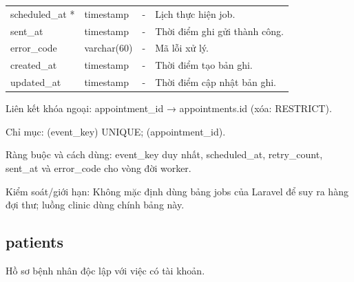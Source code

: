 {\begin{longtable}{@{}L{\textwidth-4.86pt\relax} L{\textwidth-3.96pt\relax} L{\textwidth-2.88pt\relax} L{\textwidth-6.3pt\relax}@{}}
scheduled\_\allowbreak{}at * & timestamp & - & Lịch thực hiện job.\allowbreak{}\\[1pt]
sent\_\allowbreak{}at & timestamp & - & Thời điểm ghi gửi thành công.\allowbreak{}\\[1pt]
error\_\allowbreak{}code & varchar(60) & - & Mã lỗi xử lý.\allowbreak{}\\[1pt]
created\_\allowbreak{}at & timestamp & - & Thời điểm tạo bản ghi.\allowbreak{}\\[1pt]
updated\_\allowbreak{}at & timestamp & - & Thời điểm cập nhật bản ghi.\allowbreak{}\\[1pt]
\end{longtable}}
Liên kết khóa ngoại:\allowbreak{} appointment\_\allowbreak{}id → appointments.\allowbreak{}id (xóa:\allowbreak{} RESTRICT).\allowbreak{}

Chỉ mục:\allowbreak{} (event\_\allowbreak{}key) UNIQUE; (appointment\_\allowbreak{}id).\allowbreak{}

Ràng buộc và cách dùng:\allowbreak{} event\_\allowbreak{}key duy nhất, scheduled\_\allowbreak{}at, retry\_\allowbreak{}count, sent\_\allowbreak{}at và error\_\allowbreak{}code cho vòng đời worker.\allowbreak{}

Kiểm soát/\allowbreak{}giới hạn:\allowbreak{} Không mặc định dùng bảng jobs của Laravel để suy ra hàng đợi thư; luồng clinic dùng chính bảng này.\allowbreak{}

\clearpage

\subsection{patients}
Hồ sơ bệnh nhân độc lập với việc có tài khoản.\allowbreak{}


